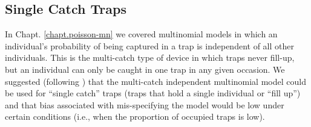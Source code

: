 \subsection{Single Catch Traps}

In Chapt. \ref{chapt.poisson-mn} we covered %
multinomial models in
which an individual's probability of being captured in a trap is
independent of all other individuals.
This is the multi-catch type of device in which traps
never fill-up, but an individual can only be caught in one trap in any given occasion. We
suggested (following \citet{efford_etal:2009euring}) that the
multi-catch independent multinomial model could be used for ``single
catch'' traps (traps that hold a single individual or ``fill up'') and
that bias associated with mis-specifying the model would be low under
certain conditions (i.e., when the proportion of occupied traps is
low).

